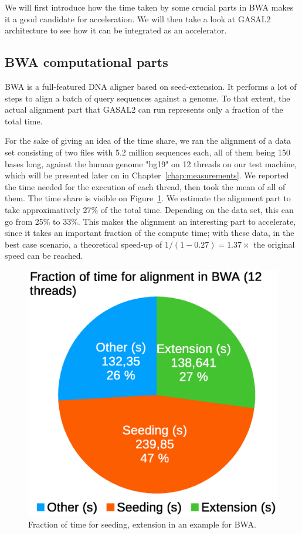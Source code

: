 

We will first introduce how the time taken by some crucial parts in BWA makes it a good candidate for acceleration. We will then take a look at GASAL2 architecture to see how it can be integrated as an accelerator.


\subsection{BWA computational parts}

BWA is a full-featured DNA aligner based on seed-extension. It performs a lot of steps to align a batch of query sequences against a genome. To that extent, the actual alignment part that GASAL2 can run represents only a fraction of the total time.

For the sake of giving an idea of the time share, we ran the alignment of a data set consisting of two files with 5.2 million sequences each, all of them being 150 bases long, against the human genome "hg19" on 12 threads on our test machine, which will be presented later on in Chapter~\ref{chap:measurements}. We reported the time needed for the execution of each thread, then took the mean of all of them. The time share is visible on Figure~\ref{fig:bwatimedivision}. We estimate the alignment part to take approximatively 27\% of the total time. Depending on the data set, this can go from 25\% to 33\%. This makes the alignment an interesting part to accelerate, since it takes an important fraction of the compute time; with these data, in the best case scenario, a theoretical speed-up of $1/\left(1 - 0.27\right) = 1.37\times$ the original speed can be reached.

\begin{figure}[h!]
	\centering
	\includegraphics[width=0.65\linewidth]{bwa_time_division}
	\caption{Fraction of time for seeding, extension in an example for BWA.}
	\label{fig:bwatimedivision}
\end{figure}


